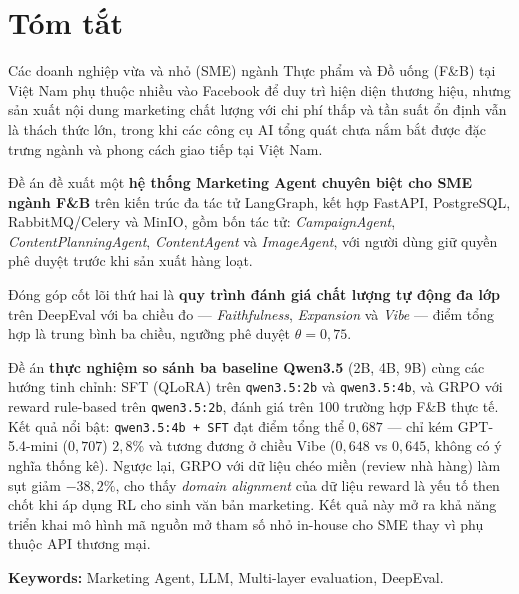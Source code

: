 \begingroup
\setlength{\parskip}{3pt plus 2pt minus 1pt}

\cleardoublepage
{}
{}
\chapter*{Tóm tắt}

Các doanh nghiệp vừa và nhỏ (SME) ngành Thực phẩm và Đồ uống (F\&B) tại Việt Nam phụ thuộc nhiều vào Facebook để duy trì hiện diện thương hiệu, nhưng sản xuất nội dung marketing chất lượng với chi phí thấp và tần suất ổn định vẫn là thách thức lớn, trong khi các công cụ AI tổng quát chưa nắm bắt được đặc trưng ngành và phong cách giao tiếp tại Việt Nam.

Đề án đề xuất một \textbf{hệ thống Marketing Agent chuyên biệt cho SME ngành F\&B} trên kiến trúc đa tác tử LangGraph, kết hợp FastAPI, PostgreSQL, RabbitMQ/Celery và MinIO, gồm bốn tác tử: \textit{CampaignAgent}, \textit{ContentPlanningAgent}, \textit{ContentAgent} và \textit{ImageAgent}, với người dùng giữ quyền phê duyệt trước khi sản xuất hàng loạt.

Đóng góp cốt lõi thứ hai là \textbf{quy trình đánh giá chất lượng tự động đa lớp} trên DeepEval với ba chiều đo --- \textit{Faithfulness}, \textit{Expansion} và \textit{Vibe} --- điểm tổng hợp là trung bình ba chiều, ngưỡng phê duyệt $\theta = 0{,}75$.

Đề án \textbf{thực nghiệm so sánh ba baseline Qwen3.5} (2B, 4B, 9B) cùng các hướng tinh chỉnh: SFT (QLoRA) trên \texttt{qwen3.5:2b} và \texttt{qwen3.5:4b}, và GRPO với reward rule-based trên \texttt{qwen3.5:2b}, đánh giá trên 100 trường hợp F\&B thực tế. Kết quả nổi bật: \texttt{qwen3.5:4b + SFT} đạt điểm tổng thể $0{,}687$ --- chỉ kém GPT-5.4-mini ($0{,}707$) $2{,}8\%$ và tương đương ở chiều Vibe ($0{,}648$ vs $0{,}645$, không có ý nghĩa thống kê). Ngược lại, GRPO với dữ liệu chéo miền (review nhà hàng) làm sụt giảm $-38{,}2\%$, cho thấy \emph{domain alignment} của dữ liệu reward là yếu tố then chốt khi áp dụng RL cho sinh văn bản marketing. Kết quả này mở ra khả năng triển khai mô hình mã nguồn mở tham số nhỏ in-house cho SME thay vì phụ thuộc API thương mại.

\vspace{0.4em}

\noindent\textbf{Keywords:} Marketing Agent, LLM, Multi-layer evaluation, DeepEval.


